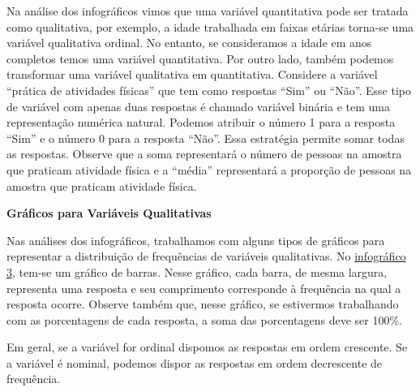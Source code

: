  \begin{observation}{}
Na análise dos infográficos vimos que uma variável quantitativa pode ser tratada como qualitativa, por exemplo, a idade trabalhada em faixas etárias torna-se uma variável qualitativa ordinal. No entanto, se consideramos a idade em anos completos temos uma variável quantitativa. Por outro lado, também podemos transformar uma variável qualitativa em quantitativa. Considere a variável ``prática de atividades físicas'' que tem como respostas ``Sim'' ou ``Não''. Esse tipo de variável com apenas duas respostas é chamado  variável binária e tem uma representação numérica natural. Podemos atribuir o número 1 para a resposta ``Sim'' e o número 0 para a resposta ``Não''. Essa estratégia permite somar todas as respostas. Observe que a soma representará o número de pessoas na amostra que praticam atividade física e a ``média'' representará a proporção de pessoas na amostra que praticam atividade física.
 \end{observation}

\textbf{Gráficos para Variáveis Qualitativas}

Nas análises dos infográficos, trabalhamos com alguns tipos de gráficos para representar a distribuição de frequências de variáveis qualitativas. No \hyperref[est1-fig-4]{infográfico 3}, tem-se um  gráfico de barras. Nesse gráfico, cada barra, de mesma largura, representa uma resposta e seu comprimento corresponde à  frequência na qual a resposta ocorre. Observe também que, nesse gráfico, se estivermos trabalhando com as porcentagens de cada resposta, a soma das porcentagens deve ser 100\%.

Em geral, se a variável for ordinal dispomos as respostas em ordem crescente. Se a variável é nominal, podemos dispor as respostas em ordem decrescente de frequência.

